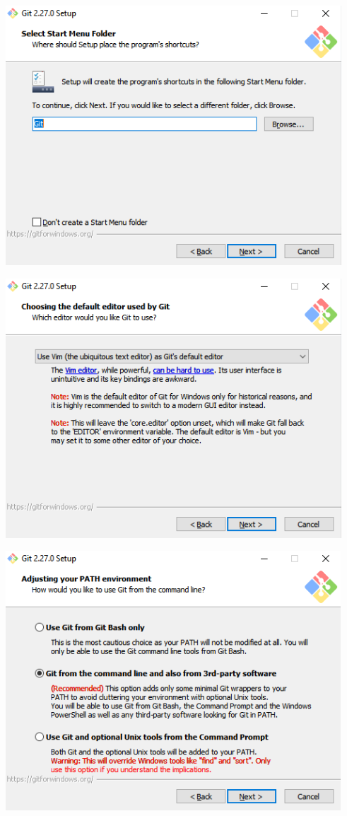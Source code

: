 \documentclass[
]{book}
\begin{document}
\includegraphics{images/05-git_5.png}

\includegraphics{images/05-git_6.png}

\includegraphics{images/05-git_7.png}
\end{document}
